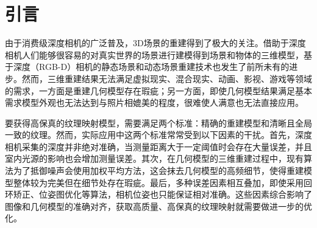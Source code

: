 

\section{引言}

由于消费级深度相机的广泛普及，3D场景的重建得到了极大的关注。借助于深度相机人们能够很容易的对真实世界的场景进行建模得到场景和物体的三维模型，基于深度（RGB-D）相机的静态场景和动态场景重建技术也发生了前所未有的进步。然而，三维重建结果无法满足虚拟现实、混合现实、动画、影视、游戏等领域的需求，一方面是重建几何模型存在瑕疵；另一方面，即使几何模型结果满足基本需求模型外观也无法达到与照片相媲美的程度，很难使人满意也无法直接应用。\par

要获得高保真的纹理映射模型，需要满足两个标准：精确的重建模型和清晰且全局一致的纹理。然而，实际应用中这两个标准常常受到以下因素的干扰。首先，深度相机采集的深度并非绝对准确，当测量距离大于一定阈值时会存在大量误差，并且室内光源的影响也会增加测量误差。其次，在几何模型的三维重建过程中，现有算法为了抵御噪声会使用加权平均方法，这会抹去几何模型的高频细节，使得重建模型整体较为完美但在细节处存在瑕疵。最后，多种误差因素相互叠加，即使采用回环矫正、位姿图优化等算法，相机位姿也只能保证相对准确。这些因素综合影响了图像和几何模型的准确对齐，获取高质量、高保真的纹理映射就需要做进一步的优化。\par


